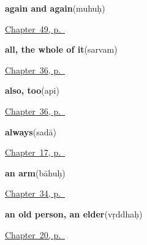 \noindent\begin{minipage}[t]{\linewidth}
\raggedright
\textbf{again and again}\enspace\emph{}\enspace(muhuḥ)\par
\footnotesize \hyperref[ch:sa-small-answers]{Chapter~49, p.~\pageref*{ch:sa-small-answers}}
\end{minipage}\par\smallskip

\noindent\begin{minipage}[t]{\linewidth}
\raggedright
\textbf{all, the whole of it}\enspace\emph{}\enspace(sarvam)\par
\footnotesize \hyperref[ch:sa-replies-more]{Chapter~36, p.~\pageref*{ch:sa-replies-more}}
\end{minipage}\par\smallskip

\noindent\begin{minipage}[t]{\linewidth}
\raggedright
\textbf{also, too}\enspace\emph{}\enspace(api)\par
\footnotesize \hyperref[ch:sa-replies-more]{Chapter~36, p.~\pageref*{ch:sa-replies-more}}
\end{minipage}\par\smallskip

\noindent\begin{minipage}[t]{\linewidth}
\raggedright
\textbf{always}\enspace\emph{}\enspace(sadā)\par
\footnotesize \hyperref[ch:sa-time]{Chapter~17, p.~\pageref*{ch:sa-time}}
\end{minipage}\par\smallskip

\noindent\begin{minipage}[t]{\linewidth}
\raggedright
\textbf{an arm}\enspace\emph{}\enspace(bāhuḥ)\par
\footnotesize \hyperref[ch:sa-limbs]{Chapter~34, p.~\pageref*{ch:sa-limbs}}
\end{minipage}\par\smallskip

\noindent\begin{minipage}[t]{\linewidth}
\raggedright
\textbf{an old person, an elder}\enspace\emph{}\enspace(vṛddhaḥ)\par
\footnotesize \hyperref[ch:sa-people]{Chapter~20, p.~\pageref*{ch:sa-people}}
\end{minipage}\par\smallskip

